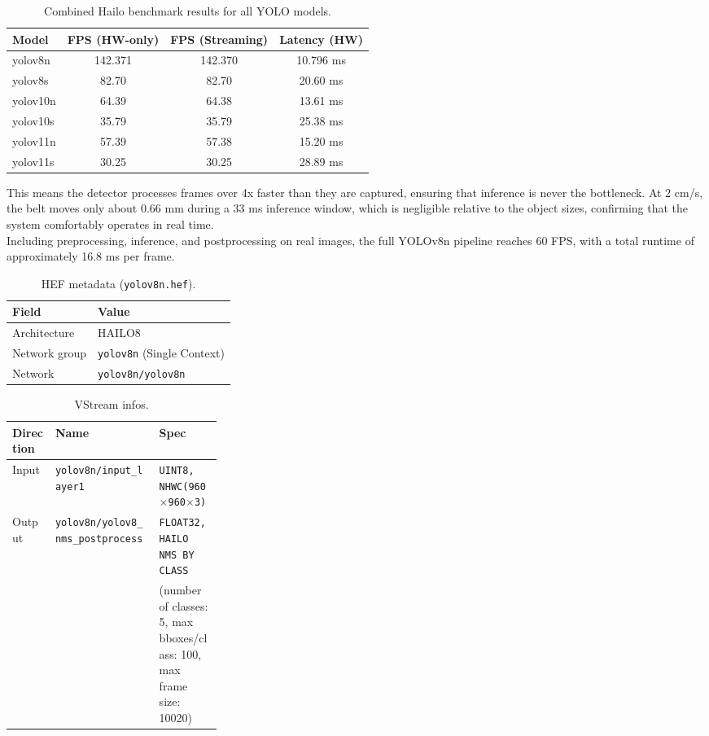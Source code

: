\documentclass[12pt,a4paper]{report}
\begin{document}
\begin{table}[h]
    \centering
    \caption{Combined Hailo benchmark results for all YOLO models.}
    \label{tab:hailo-bench-all}
    \begin{tabular}{lccc}
        \toprule
        Model & FPS (HW-only) & FPS (Streaming) & Latency (HW) \\
        \midrule
        yolov8n  & 142.371 & 142.370 & 10.796 ms \\
        yolov8s  & 82.70   & 82.70   & 20.60 ms \\
        yolov10n & 64.39   & 64.38   & 13.61 ms \\
        yolov10s & 35.79   & 35.79   & 25.38 ms \\
        yolov11n & 57.39   & 57.38   & 15.20 ms \\
        yolov11s & 30.25   & 30.25   & 28.89 ms \\
        \bottomrule
    \end{tabular}
\end{table}

This means the detector processes frames over 4x faster than they are captured, ensuring
that inference is never the bottleneck. At 2 cm/s, the belt moves only about 0.66 mm during
a 33 ms inference window, which is negligible relative to the object sizes, confirming that the
system comfortably operates in real time. \\

Including preprocessing, inference, and postprocessing on real images, the full YOLOv8n pipeline
reaches 60 FPS, with a total runtime of approximately 16.8 ms per frame.


\begin{table}[!tb]
  \centering
  \caption{HEF metadata (\texttt{yolov8n.hef}).}
  \label{tab:hef-meta}
  \begin{tabular}{ll}
    \toprule
    Field & Value \\
    \midrule
    Architecture & HAILO8 \\
    Network group & \texttt{yolov8n} (Single Context) \\
    Network & \texttt{yolov8n/yolov8n} \\
    \bottomrule
  \end{tabular}
\end{table}

\begin{table}[!tb]
  \centering
  \small
  \caption{VStream infos.}
  \label{tab:vstream}
  \begin{tabular}{llp{0.3\linewidth}}
    \toprule
    Direction & Name & Spec \\
    \midrule
    Input  & \texttt{yolov8n/input\_layer1}
           & \texttt{UINT8, NHWC(960$\times$960$\times$3)} \\
    Output & \texttt{yolov8n/yolov8\_nms\_postprocess}
           & \texttt{FLOAT32, HAILO NMS BY CLASS} \\
           & &
           \small(number of classes: 5, max bboxes/class: 100, max frame size: 10020) \\
    \bottomrule
  \end{tabular}
\end{table}
\end{document}
